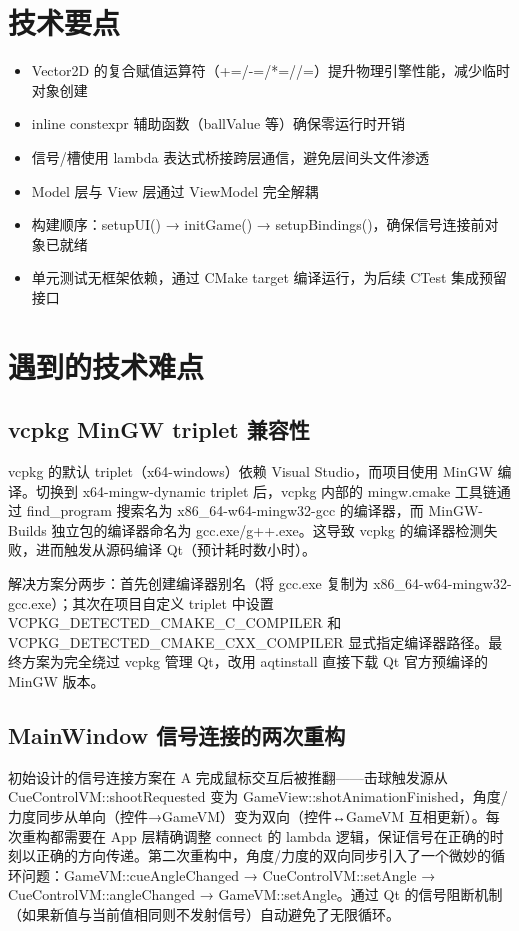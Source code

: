 \documentclass[11pt]{ctexart}
\begin{document}
\section{技术要点}

\begin{itemize}
\item Vector2D 的复合赋值运算符（+=/-=/*=//=）提升物理引擎性能，减少临时对象创建
\item inline constexpr 辅助函数（ballValue 等）确保零运行时开销
\item 信号/槽使用 lambda 表达式桥接跨层通信，避免层间头文件渗透
\item Model 层与 View 层通过 ViewModel 完全解耦
\item 构建顺序：setupUI() → initGame() → setupBindings()，确保信号连接前对象已就绪
\item 单元测试无框架依赖，通过 CMake target 编译运行，为后续 CTest 集成预留接口
\end{itemize}

\section{遇到的技术难点}

\subsection{vcpkg MinGW triplet 兼容性}

vcpkg 的默认 triplet（x64-windows）依赖 Visual Studio，而项目使用 MinGW 编译。切换到 x64-mingw-dynamic triplet 后，vcpkg 内部的 mingw.cmake 工具链通过 find\_program 搜索名为 x86\_64-w64-mingw32-gcc 的编译器，而 MinGW-Builds 独立包的编译器命名为 gcc.exe/g++.exe。这导致 vcpkg 的编译器检测失败，进而触发从源码编译 Qt（预计耗时数小时）。

解决方案分两步：首先创建编译器别名（将 gcc.exe 复制为 x86\_64-w64-mingw32-gcc.exe）；其次在项目自定义 triplet 中设置 VCPKG\_DETECTED\_CMAKE\_C\_COMPILER 和 VCPKG\_DETECTED\_CMAKE\_CXX\_COMPILER 显式指定编译器路径。最终方案为完全绕过 vcpkg 管理 Qt，改用 aqtinstall 直接下载 Qt 官方预编译的 MinGW 版本。

\subsection{MainWindow 信号连接的两次重构}

初始设计的信号连接方案在 A 完成鼠标交互后被推翻——击球触发源从 CueControlVM::shootRequested 变为 GameView::shotAnimationFinished，角度/力度同步从单向（控件→GameVM）变为双向（控件↔GameVM 互相更新）。每次重构都需要在 App 层精确调整 connect 的 lambda 逻辑，保证信号在正确的时刻以正确的方向传递。第二次重构中，角度/力度的双向同步引入了一个微妙的循环问题：GameVM::cueAngleChanged → CueControlVM::setAngle → CueControlVM::angleChanged → GameVM::setAngle。通过 Qt 的信号阻断机制（如果新值与当前值相同则不发射信号）自动避免了无限循环。
\end{document}
